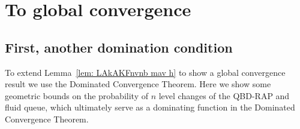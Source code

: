 \section{To global convergence}\label{sec: local to global}
\subsection{First, another domination condition}
To extend Lemma~\ref{lem: LAkAKFnvnb mav h} to show a global convergence result we use the Dominated Convergence Theorem. Here we show some geometric bounds on the probability of \(n\) level changes of the QBD-RAP and fluid queue, which ultimately serve as a dominating function in the Dominated Convergence Theorem. 


